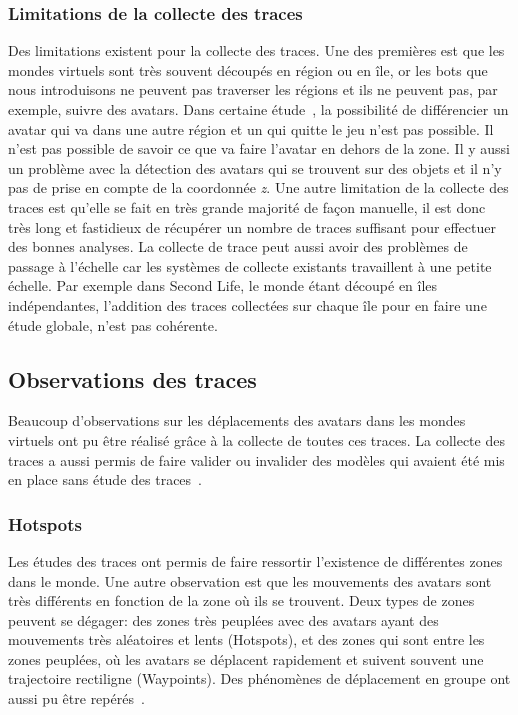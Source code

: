  		\subsubsection{Limitations de la collecte des traces}
	Des limitations existent pour la collecte des traces. Une des premières est que les mondes virtuels sont très souvent découpés en région ou en île, or les bots que nous introduisons ne peuvent pas traverser les régions et ils ne peuvent pas, par exemple, suivre des avatars. Dans certaine étude~\cite{DBLP:journals/corr/abs-0807-2328}, la possibilité de différencier un avatar qui va dans une autre région et un qui quitte le jeu n'est pas possible. Il n'est pas possible de savoir ce que va faire l'avatar en dehors de la zone. Il y aussi un problème avec la détection des avatars qui se trouvent sur des objets et il n'y pas de prise en compte de la coordonnée \textit{z}. Une autre limitation de la collecte des traces est qu'elle se fait en très grande majorité de façon manuelle, il est donc très long et fastidieux de récupérer un nombre de traces suffisant pour effectuer des bonnes analyses. La collecte de trace peut aussi avoir des problèmes de passage à l'échelle car les systèmes de collecte existants travaillent à une petite échelle. Par exemple dans Second Life, le monde étant découpé en îles indépendantes, l'addition des traces collectées sur chaque île pour en faire une étude globale, n'est pas cohérente.

	\subsection{Observations des traces}
	 Beaucoup d'observations sur les déplacements des avatars dans les mondes virtuels ont pu être réalisé grâce à la collecte de toutes ces traces. La collecte des traces a aussi permis de faire valider ou invalider des modèles qui avaient été mis en place sans étude des traces~\cite{DBLP:journals/corr/abs-0807-2328}. 
		\subsubsection{Hotspots}
	Les études des traces ont permis de faire ressortir l'existence de différentes zones dans le monde. Une autre observation est que les mouvements des avatars sont très différents en fonction de la zone où ils se trouvent. Deux types de zones peuvent se dégager: des zones très peuplées avec des avatars ayant des mouvements très aléatoires et lents (Hotspots), et des zones qui sont entre les zones peuplées, où les avatars se déplacent rapidement et suivent souvent une trajectoire rectiligne (Waypoints). Des phénomènes de déplacement en groupe ont aussi pu être repérés~\cite{15141312}. \\
